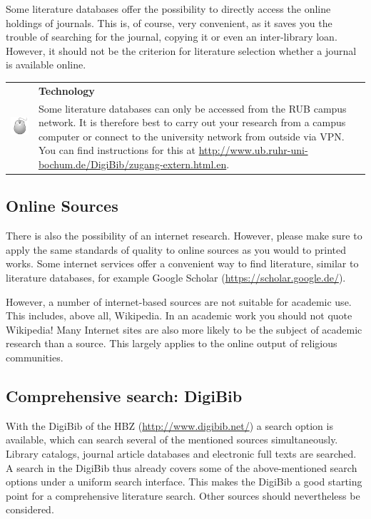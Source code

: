 \documentclass[
  english,
]{scrreprt}
\newlength{\iconwidth}
\newenvironment{displaybox}[2]{%
    \begin{center}
        \setlength\arrayrulewidth{0.75pt}%
        \arrayrulecolor{white}%
        \renewcommand{\arraystretch}{1.3}%
        \begin{tabular}{p{\iconwidth}p{\linewidth-4\tabcolsep-\iconwidth}}
            \multirow{2}{*}{#2}&\cellcolor{boxheadcol}\textbf{\sffamily\color{white}#1} \\%
            \hhline{~-}%
            &\cellcolor{boxcol}%
}{%
            \\
        \end{tabular}
        \arrayrulecolor{black}
    \end{center}
}
\newenvironment{Technology}{%
\begin{displaybox}{Technology}{\includegraphics[width=\iconwidth]{images/icon-technik}}}%
{\end{displaybox}}
\begin{document}
Some literature databases offer the possibility to directly access the online holdings of journals. This is, of course, very convenient, as it saves you the trouble of searching for the journal, copying it or even an inter-library loan. However, it should not be the criterion for literature selection whether a journal is available online.

\begin{Technology}

Some literature databases can only be accessed from the RUB campus network. It is therefore best to carry out your research from a campus computer or connect to the university network from outside via VPN. You can find instructions for this at \url{http://www.ub.ruhr-uni-bochum.de/DigiBib/zugang-extern.html.en}.

\end{Technology}

\subsection{Online Sources}\label{online-sources}

There is also the possibility of an internet research. However, please make sure to apply the same standards of quality to online sources as you would to printed works. Some internet services offer a convenient way to find literature, similar to literature databases, for example Google Scholar (\url{https://scholar.google.de/}).

However, a number of internet-based sources are not suitable for academic use. This includes, above all, Wikipedia. In an academic work you should not quote Wikipedia! Many Internet sites are also more likely to be the subject of academic research than a source. This largely applies to the online output of religious communities.

\subsection{Comprehensive search: DigiBib}\label{comprehensive-search-digibib}

With the DigiBib of the HBZ (\url{http://www.digibib.net/}) a search option is available, which can search several of the mentioned sources simultaneously. Library catalogs, journal article databases and electronic full texts are searched. A search in the DigiBib thus already covers some of the above-mentioned search options under a uniform search interface. This makes the DigiBib a good starting point for a comprehensive literature search. Other sources should nevertheless be considered.
\end{document}
